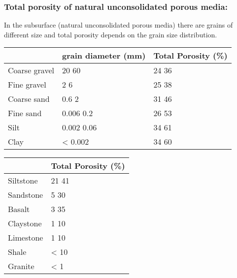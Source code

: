 \documentclass[letterpaper,10pt,english]{sphinxmanual}
\begin{document}
\subsubsection{Total porosity of natural unconsolidated porous media:}
\label{\detokenize{contents/flow/12_subsurface_structure:total-porosity-of-natural-unconsolidated-porous-media}}
In the subsurface (natural unconsolidated porous media) there are grains of different size and total porosity depends on the grain size distribution.


\begin{savenotes}\sphinxattablestart
\centering
\begin{tabulary}{\linewidth}[t]{|T|T|T|}
\hline


&\sphinxstyletheadfamily 
grain  diameter  (mm)
&\sphinxstyletheadfamily 
Total  Porosity (\%)
\\
\hline
Coarse gravel
&
20 \sphinxhyphen{} 60
&
24 \sphinxhyphen{} 36
\\
\hline
Fine gravel
&
2 \sphinxhyphen{} 6
&
25 \sphinxhyphen{} 38
\\
\hline
Coarse sand
&
0.6 \sphinxhyphen{} 2
&
31 \sphinxhyphen{} 46
\\
\hline
Fine sand
&
0.006 \sphinxhyphen{} 0.2
&
26 \sphinxhyphen{} 53
\\
\hline
Silt
&
0.002 \sphinxhyphen{} 0.06
&
34 \sphinxhyphen{} 61
\\
\hline
Clay
&
\textless{} 0.002
&
34 \sphinxhyphen{} 60
\\
\hline
\end{tabulary}
\par
\sphinxattableend\end{savenotes}


\begin{savenotes}\sphinxattablestart
\centering
\begin{tabulary}{\linewidth}[t]{|T|T|}
\hline


&\sphinxstyletheadfamily 
Total  Porosity (\%)
\\
\hline
Siltstone
&
21 \sphinxhyphen{} 41
\\
\hline
Sandstone
&
5 \sphinxhyphen{} 30
\\
\hline
Basalt
&
3 \sphinxhyphen{} 35
\\
\hline
Claystone
&
1 \sphinxhyphen{} 10
\\
\hline
Limestone
&
1 \sphinxhyphen{} 10
\\
\hline
Shale
&
\textless{} 10
\\
\hline
Granite
&
\textless{} 1
\\
\hline
\end{tabulary}
\par
\sphinxattableend\end{savenotes}
\end{document}
